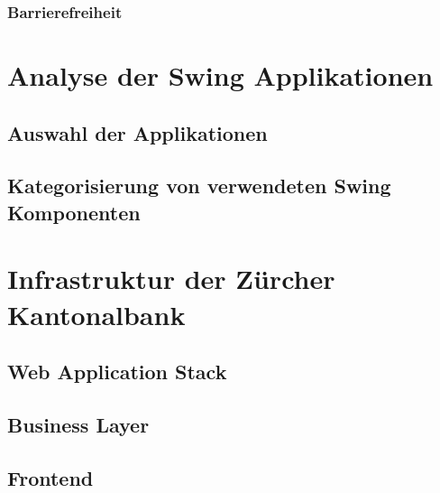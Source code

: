 \documentclass[
11pt, %
a4paper, %
BCOR25mm, %
DIV14, %
footsepline = false, %
headsepline, %
twoside, %
openright,
abstracton, %
listof=totocnumbered, %
bibliography=totocnumbered %
]{scrreprt}
\begin{document}
  \subsection{Barrierefreiheit}

  \cleardoublepage
   
   
  \chapter{Analyse der Swing Applikationen}
  
  \section{Auswahl der Applikationen}
  
  \section{Kategorisierung von verwendeten Swing Komponenten}

  \cleardoublepage
   
   
  \chapter{Infrastruktur der Zürcher Kantonalbank}
  
  \section{Web Application Stack}
  
  \section{Business Layer}
  
  \section{Frontend}

  \cleardoublepage
  
   
\end{document}
